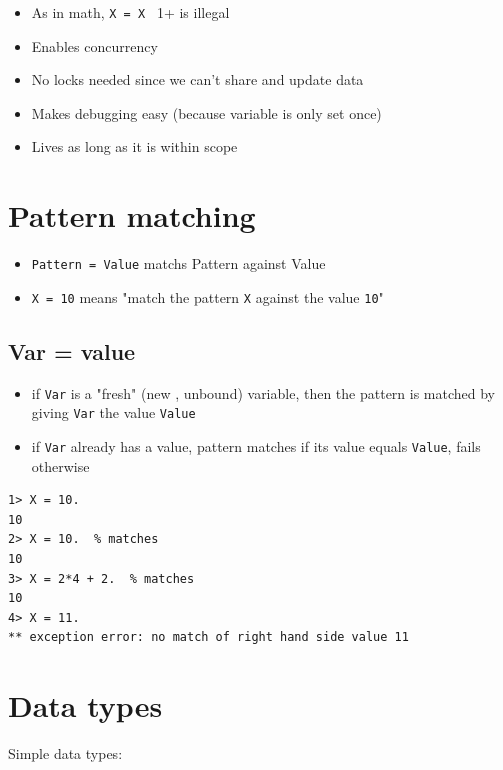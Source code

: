 \documentclass[12pt]{article}
\begin{document}
\begin{itemize}
\item As in math, \verb+X = X + 1+ is illegal
\item Enables concurrency
\item No locks needed since we can't share and update data
\item Makes debugging easy (because variable is only set once)
\item Lives as long as it is within scope
\end{itemize}

\section{Pattern matching}

\begin{itemize}
\item \verb+Pattern = Value+ matchs Pattern against Value
\item \verb+X = 10+
means "match the pattern \verb+X+ against the value \verb+10+"
\end{itemize}

\subsection{Var = value}

\begin{itemize}
\item if \verb+Var+ is a "fresh" (new , unbound) variable, then the pattern is matched by giving \verb+Var+ the value \verb+Value+
\item if \verb+Var+ already has a value, pattern matches if its value equals \verb+Value+, fails otherwise
\end{itemize}

\begin{verbatim}
1> X = 10.
10
2> X = 10.  % matches
10
3> X = 2*4 + 2.  % matches
10
4> X = 11.
** exception error: no match of right hand side value 11
\end{verbatim}


\section{Data types}

Simple data types:
\end{document}

